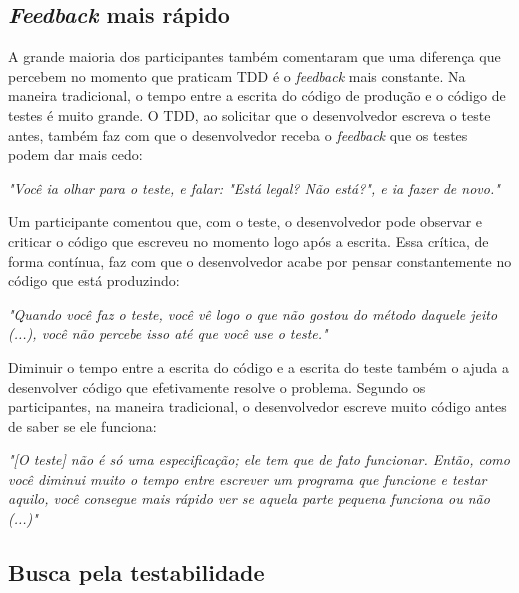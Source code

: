 \documentclass[conference]{IEEEtran}
\begin{document}
\subsection{\textit{Feedback} mais rápido}

A grande maioria dos participantes também comentaram que uma diferença que percebem
no momento que praticam TDD é o \textit{feedback} mais constante. Na maneira
tradicional, o tempo entre a escrita do código de produção e o código
de testes é muito grande. O TDD, ao solicitar que o desenvolvedor
escreva o teste antes, também faz com que o desenvolvedor receba o \textit{feedback} que
os testes podem dar mais cedo:

\begin{framed}
\textit{"Você ia olhar para o teste, e falar: "Está legal? Não está?", e ia fazer de novo."}
\end{framed}

Um participante comentou que, com o teste, o desenvolvedor pode observar
e criticar o código que escreveu no momento logo após a escrita.
Essa crítica, de forma contínua, faz com que o desenvolvedor acabe
por pensar constantemente no código que está produzindo:

\begin{framed}
\textit{"Quando você faz o teste, você vê logo o que não gostou do método daquele jeito (...), você
não percebe isso até que você use o teste."}
\end{framed}

Diminuir o tempo entre a escrita do código e a escrita do teste também o ajuda a desenvolver código
que efetivamente resolve o problema. Segundo os participantes, na maneira tradicional, 
o desenvolvedor escreve muito código antes de saber se ele funciona:

\begin{framed}
\textit{"[O teste] não é só uma especificação; ele tem que de fato funcionar. Então,
como você diminui muito o tempo entre escrever um programa que funcione e testar aquilo,
você consegue mais rápido ver se aquela parte pequena funciona ou não (...)"}
\end{framed}

\subsection{Busca pela testabilidade}
\end{document}
